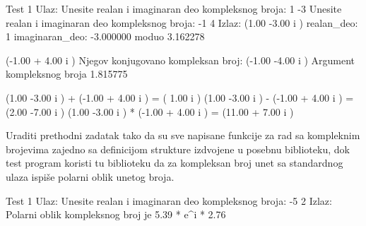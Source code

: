 \begin{Exercise}[label=001]
\begin{maxitest}
\begin{test}{Test 1}
Ulaz:   Unesite realan i imaginaran deo kompleksnog broja: 1 -3 
          Unesite realan i imaginaran deo kompleksnog broja: -1 4 
Izlaz:  (1.00 -3.00 i )
          realan_deo: 1
          imaginaran_deo: -3.000000
          moduo 3.162278

          (-1.00 + 4.00 i )
          Njegov konjugovano kompleksan broj: (-1.00 -4.00 i )
          Argument kompleksnog broja 1.815775

          (1.00 -3.00 i ) + (-1.00 + 4.00 i )  =  ( 1.00 i )
          (1.00 -3.00 i ) - (-1.00 + 4.00 i )  =  (2.00 -7.00 i )
          (1.00 -3.00 i ) * (-1.00 + 4.00 i )  =  (11.00 + 7.00 i ) 
\end{test}
\end{maxitest}


\end{Exercise}
\begin{Answer}[ref=001]
\end{Answer}

\begin{Exercise}[label=002] %
Uraditi prethodni zadatak tako da su sve napisane funkcije za rad sa kompleknim brojevima zajedno sa definicijom strukture  izdvojene u posebnu biblioteku, dok test program koristi tu biblioteku da za kompleksan broj unet sa standardnog ulaza ispiše polarni oblik unetog broja.

\begin{maxitest}
\begin{test}{Test 1}
Ulaz:   Unesite realan i imaginaran deo kompleksnog broja: -5 2 
Izlaz:   Polarni oblik kompleksnog broj je 5.39 *  e^i * 2.76
\end{test}
\end{maxitest}


\end{Exercise}
\begin{Answer}[ref=002]
\end{Answer}


